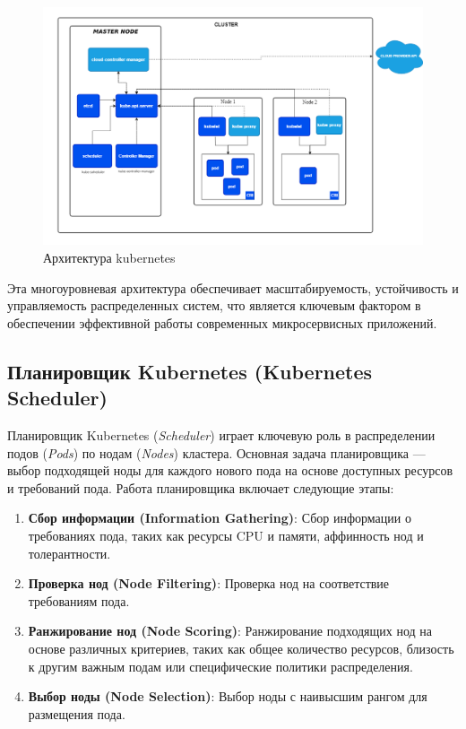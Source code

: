 \begin{figure}[h]
    \centering
    \includegraphics[scale=0.4]{img/8.png}
    \caption{Архитектура kubernetes}
    \label{fig:ccg}
  \end{figure}

Эта многоуровневая архитектура обеспечивает масштабируемость, устойчивость и
управляемость распределенных систем, что является ключевым фактором в
обеспечении эффективной работы современных микросервисных приложений.

\subsection*{Планировщик Kubernetes (Kubernetes Scheduler)}

Планировщик Kubernetes (\textit{Scheduler}) играет ключевую роль в распределении
подов (\textit{Pods}) по нодам (\textit{Nodes}) кластера. Основная задача
планировщика — выбор подходящей ноды для каждого нового пода на основе доступных
ресурсов и требований пода. \cite{luksa2017kubernetes}
Работа планировщика включает следующие этапы:

\begin{enumerate}
    \item \textbf{Сбор информации (Information Gathering)}: Сбор информации о
требованиях пода, таких как ресурсы CPU и памяти, аффинность нод и
толерантности.
    \item \textbf{Проверка нод (Node Filtering)}: Проверка нод на соответствие
требованиям пода.
    \item \textbf{Ранжирование нод (Node Scoring)}: Ранжирование подходящих нод
на основе различных критериев, таких как общее количество ресурсов, близость к
другим важным подам или специфические политики распределения.
    \item \textbf{Выбор ноды (Node Selection)}: Выбор ноды с наивысшим рангом
для размещения пода.
\end{enumerate}

